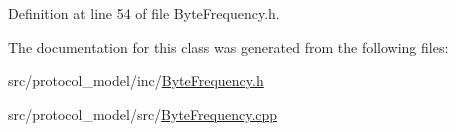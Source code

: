 Definition at line 54 of file Byte\-Frequency.\-h.



The documentation for this class was generated from the following files\-:\begin{DoxyCompactItemize}
\item 
src/protocol\-\_\-model/inc/\hyperlink{_byte_frequency_8h}{Byte\-Frequency.\-h}\item 
src/protocol\-\_\-model/src/\hyperlink{_byte_frequency_8cpp}{Byte\-Frequency.\-cpp}\end{DoxyCompactItemize}
